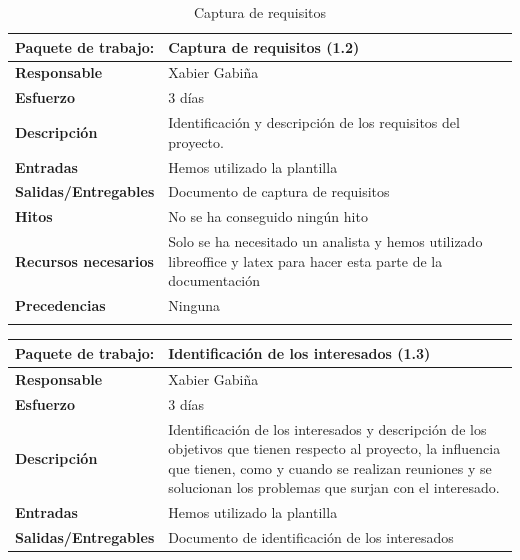 \documentclass{report}
\begin{document}
\begin{center}
\begin{longtable}{|p{6cm}|p{6cm}|}
                    \hline
                    \textbf{Paquete de trabajo:} & Captura de requisitos (1.2)\\
                    \hline
                    \textbf{Responsable} & Xabier Gabiña\\
                    \hline
                    \textbf{Esfuerzo} & 3 días\\
                    \hline
                    \textbf{Descripción} & Identificación y descripción de los requisitos del proyecto.\\
                    \hline
                    \textbf{Entradas} & Hemos utilizado la plantilla\\
                    \hline
                    \textbf{Salidas/Entregables} & Documento de captura de requisitos\\
                    \hline
                    \textbf{Hitos} & No se ha conseguido ningún hito\\
                    \hline
                    \textbf{Recursos necesarios} & Solo se ha necesitado un analista y hemos utilizado libreoffice y latex para hacer esta parte de la documentación\\
                    \hline
                    \textbf{Precedencias} & Ninguna\\
                    \hline
                    \caption{Captura de requisitos}
                \end{longtable}
                \clearpage
                \begin{longtable}{|p{6cm}|p{6cm}|}
                    \hline
                    \textbf{Paquete de trabajo:} & Identificación de los interesados (1.3)\\
                    \hline
                    \textbf{Responsable} & Xabier Gabiña\\
                    \hline
                    \textbf{Esfuerzo} & 3 días\\
                    \hline
                    \textbf{Descripción} & Identificación de los interesados y descripción de los objetivos que tienen respecto al proyecto, la influencia que tienen, como y cuando se realizan reuniones y se solucionan los problemas que surjan con el interesado.\\
                    \hline
                    \textbf{Entradas} & Hemos utilizado la plantilla\\
                    \hline
                    \textbf{Salidas/Entregables} & Documento de identificación de los interesados\\

\end{longtable}
\end{center}
\end{document}
